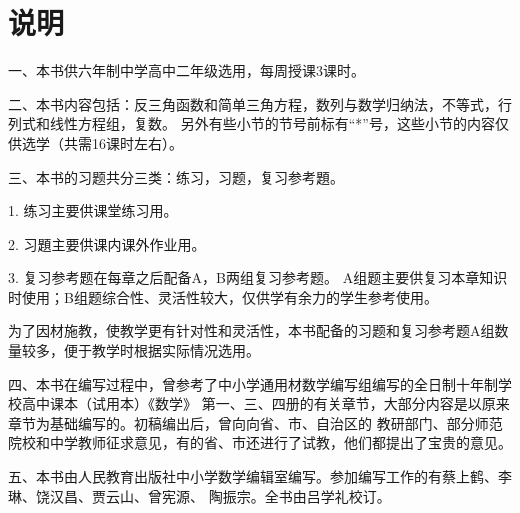 
\chapter{说明}

一、本书供六年制中学高中二年级选用，每周授课3课时。

二、本书内容包括：反三角函数和简单三角方程，数列与数学归纳法，不等式，行列式和线性方程组，复数。
另外有些小节的节号前标有“*”号，这些小节的内容仅供选学（共需16课时左右）。

三、本书的习题共分三类：练习，习题，复习参考題。

1. 练习\quad 主要供课堂练习用。

2. 习題\quad 主要供课内课外作业用。

3. 复习参考题\quad 在每章之后配备A，B两组复习参考题。
A组题主要供复习本章知识时使用；B组题综合性、灵活性较大，仅供学有余力的学生参考使用。

为了因材施教，使教学更有针对性和灵活性，本书配备的习题和复习参考题A组数量较多，便于教学时根据实际情况选用。

四、本书在编写过程中，曾参考了中小学通用材数学编写组编写的全日制十年制学校高中课本（试用本）《数学》
第一、三、四册的有关章节，大部分内容是以原来章节为基础编写的。初稿编出后，曾向向省、市、自治区的
教研部门、部分师范院校和中学教师征求意见，有的省、市还进行了试教，他们都提出了宝贵的意见。

五、本书由人民教育出版社中小学数学编辑室编写。参加编写工作的有蔡上鹤、李琳、饶汉昌、贾云山、曾宪源、
陶振宗。全书由吕学礼校订。
